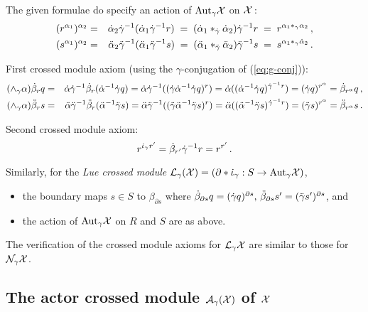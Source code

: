 \noindent 
The given formulae do specify an action of $\mathrm{Aut}_{\gamma}\mathcal{X}$ on $\mathcal{X}$\,: 
\begin{eqnarray*}
(r^{\alpha_1})^{\alpha_2} 
& = & \dot{\alpha}_2 \dot{\gamma}^{-1} (\dot{\alpha}_1 \dot{\gamma}^{-1} r)
\;=\; (\dot{\alpha}_1 \ast_{\dot{\gamma}} \dot{\alpha}_2) \dot{\gamma}^{-1} r
\;=\; r^{\alpha_1 \ast_{\gamma} \alpha_2}\,, \\ 
(s^{\alpha_1})^{\alpha_2} 
& = & \ddot{\alpha}_2 \ddot{\gamma}^{-1} (\ddot{\alpha}_1 \ddot{\gamma}^{-1} s)
\;=\; (\ddot{\alpha}_1 \ast_{\ddot{\gamma}} \ddot{\alpha}_2) \ddot{\gamma}^{-1} s
\;=\; s^{\alpha_1 \ast_{\gamma} \dot{\alpha}_2}\,.  
\end{eqnarray*} 

\noindent 
First crossed module axiom 
(using the $\gamma$-conjugation of (\ref{eq:g-conj})): 
\begin{eqnarray*} 
(\wedge_{\gamma} \alpha)\dot{\beta}_r q 
 &=& \dot{\alpha}\dot{\gamma}^{-1}\dot{\beta}_r(\dot{\alpha}^{-1}\dot{\gamma} q) 
  =  \dot{\alpha}\dot{\gamma}^{-1} ((\dot{\gamma}\dot{\alpha}^{-1}\dot{\gamma} q)^r) 
  =  \dot{\alpha} ((\dot{\alpha}^{-1}\dot{\gamma} q)^{\dot{\gamma}^{-1}r}) 
  =  (\dot{\gamma} q)^{r^{\alpha}}  
  =  \dot{\beta}_{r^{\alpha}} q\,, \\
(\wedge_{\gamma} \alpha)\ddot{\beta}_r s 
 &=& \ddot{\alpha}\ddot{\gamma}^{-1}\ddot{\beta}_r(\ddot{\alpha}^{-1}\ddot{\gamma} s) 
  =  \ddot{\alpha}\ddot{\gamma}^{-1} ((\ddot{\gamma}\ddot{\alpha}^{-1}\ddot{\gamma} s)^r) 
  =  \ddot{\alpha} ((\ddot{\alpha}^{-1}\ddot{\gamma} s)^{\dot{\gamma}^{-1}r}) 
  =  (\ddot{\gamma} s)^{r^{\alpha}}  
  =  \ddot{\beta}_{r^{\alpha}} s\,. 
\end{eqnarray*}

\noindent 
Second crossed module axiom: 
$$
r^{\dot{\iota}_{\gamma} r'} 
 = \dot{\beta}_{r'} \dot{\gamma}^{-1}r 
 = r^{r'}\,.
$$

\medskip\noindent 
Similarly, for the \emph{Lue crossed module} 
$\mathcal{L}_{\gamma}(\mathcal{X}) = (\partial*\dot{\iota}_{\gamma} : S \to \mathrm{Aut}_{\gamma}\mathcal{X})$, 
\begin{itemize} 
\item
the boundary maps $s \in S$ to $\beta_{\partial s}$ where 
$\dot{\beta}_{\partial s}q = (\dot{\gamma} q)^{\partial s},\, 
\ddot{\beta}_{\partial s}s' = (\ddot{\gamma} s')^{\partial s}$,  and 
\item
the action of $\mathrm{Aut}_{\gamma}\mathcal{X}$ on $R$ and $S$ are as above. 
\end{itemize} 
The verification of the crossed module axioms for $\mathcal{L}_{\gamma}\mathcal{X}$ 
are similar to those for $\mathcal{N}_{\gamma}\mathcal{X}$. 



\subsection{The actor crossed module $\mathcal{A}_{\gamma}(\mathcal{X})$ of $\mathcal{X}$}  
\label{subs:AX}

